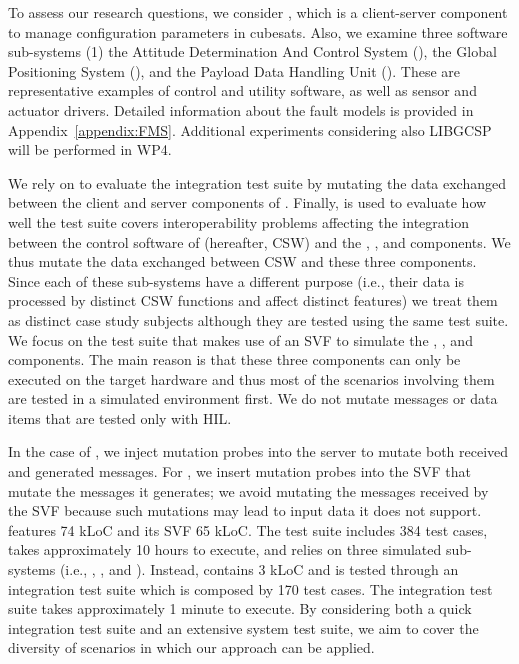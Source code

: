 To assess our research questions, we consider \PARAM, which is a client-server component to manage configuration parameters in cubesats. 
Also, we examine three \ESAIL software sub-systems (1) the Attitude Determination And Control System (\ADCS), the Global Positioning System (\GPS), and the Payload Data Handling Unit (\PDHU). {These are representative examples of control and utility software, as well as sensor and actuator drivers.} Detailed information about the fault models is provided in Appendix~\ref{appendix:FMS}. Additional experiments considering also LIBGCSP will be performed in WP4.

We rely on \APPR to evaluate the \PARAM integration test suite by  mutating the data exchanged between the client and server components of \PARAM.
Finally, \APPR is used to evaluate how well the
\ESAIL test suite covers interoperability problems affecting the integration between the control software of \ESAIL (hereafter, CSW) and the \ADCS, \PDHU, and \GPS components. We thus
mutate the data exchanged between \ESAIL CSW and these three components.
Since each of these sub-systems have a  different purpose (i.e., their data is processed by distinct CSW functions and affect distinct \ESAIL features) we treat them as distinct case study subjects although they are tested using the same test suite. We focus on the \ESAIL test suite that makes use of an SVF to simulate the \ADCS, \PDHU, and \GPS components.
The main reason is that these three components can only be executed on the target hardware and thus most of the scenarios involving them are tested in a simulated environment first.
We do not mutate messages or data items that are tested only with HIL.

In the case of \PARAM, we inject mutation probes into the \PARAM server to mutate both received and generated messages. For \ESAIL, we insert mutation probes into the SVF that mutate the messages it generates; we avoid mutating the messages received by the SVF because such mutations may lead to input data it does not support.
\ESAIL features 74 kLoC and its SVF 65 kLoC.
The \ESAIL test suite includes 384 test cases, takes approximately 10 hours to execute, and relies on three simulated
\SVF sub-systems (i.e., \ADCS, \GPS, and \PDHU).
Instead, \PARAM contains 3 kLoC and is tested through an integration test suite which is composed by 170 test cases.
The \PARAM integration test suite takes approximately 1 minute to execute.
By considering both a quick integration test suite and an extensive system test suite, we aim to cover the diversity of scenarios in which our approach can be applied.


